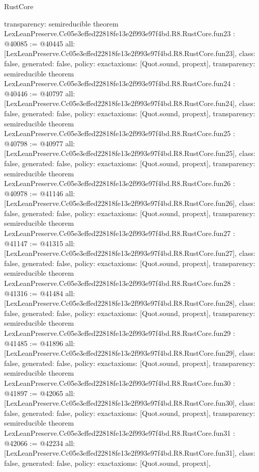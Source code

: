 \begin{lexlean}{RustCore}
\begin{coremodule}
{  transparency: semireducible
}
theorem LexLeanPreserve.Cc05e3effed22818fe13e2f993e97f4bd.R8.RustCore.fun23 : @40085 := @40445 {
  all: [LexLeanPreserve.Cc05e3effed22818fe13e2f993e97f4bd.R8.RustCore.fun23],
  class: false,
  generated: false,
  policy: exact{axioms: [Quot.sound, propext]},
  transparency: semireducible
}
theorem LexLeanPreserve.Cc05e3effed22818fe13e2f993e97f4bd.R8.RustCore.fun24 : @40446 := @40797 {
  all: [LexLeanPreserve.Cc05e3effed22818fe13e2f993e97f4bd.R8.RustCore.fun24],
  class: false,
  generated: false,
  policy: exact{axioms: [Quot.sound, propext]},
  transparency: semireducible
}
theorem LexLeanPreserve.Cc05e3effed22818fe13e2f993e97f4bd.R8.RustCore.fun25 : @40798 := @40977 {
  all: [LexLeanPreserve.Cc05e3effed22818fe13e2f993e97f4bd.R8.RustCore.fun25],
  class: false,
  generated: false,
  policy: exact{axioms: [Quot.sound, propext]},
  transparency: semireducible
}
theorem LexLeanPreserve.Cc05e3effed22818fe13e2f993e97f4bd.R8.RustCore.fun26 : @40978 := @41146 {
  all: [LexLeanPreserve.Cc05e3effed22818fe13e2f993e97f4bd.R8.RustCore.fun26],
  class: false,
  generated: false,
  policy: exact{axioms: [Quot.sound, propext]},
  transparency: semireducible
}
theorem LexLeanPreserve.Cc05e3effed22818fe13e2f993e97f4bd.R8.RustCore.fun27 : @41147 := @41315 {
  all: [LexLeanPreserve.Cc05e3effed22818fe13e2f993e97f4bd.R8.RustCore.fun27],
  class: false,
  generated: false,
  policy: exact{axioms: [Quot.sound, propext]},
  transparency: semireducible
}
theorem LexLeanPreserve.Cc05e3effed22818fe13e2f993e97f4bd.R8.RustCore.fun28 : @41316 := @41484 {
  all: [LexLeanPreserve.Cc05e3effed22818fe13e2f993e97f4bd.R8.RustCore.fun28],
  class: false,
  generated: false,
  policy: exact{axioms: [Quot.sound, propext]},
  transparency: semireducible
}
theorem LexLeanPreserve.Cc05e3effed22818fe13e2f993e97f4bd.R8.RustCore.fun29 : @41485 := @41896 {
  all: [LexLeanPreserve.Cc05e3effed22818fe13e2f993e97f4bd.R8.RustCore.fun29],
  class: false,
  generated: false,
  policy: exact{axioms: [Quot.sound, propext]},
  transparency: semireducible
}
theorem LexLeanPreserve.Cc05e3effed22818fe13e2f993e97f4bd.R8.RustCore.fun30 : @41897 := @42065 {
  all: [LexLeanPreserve.Cc05e3effed22818fe13e2f993e97f4bd.R8.RustCore.fun30],
  class: false,
  generated: false,
  policy: exact{axioms: [Quot.sound, propext]},
  transparency: semireducible
}
theorem LexLeanPreserve.Cc05e3effed22818fe13e2f993e97f4bd.R8.RustCore.fun31 : @42066 := @42234 {
  all: [LexLeanPreserve.Cc05e3effed22818fe13e2f993e97f4bd.R8.RustCore.fun31],
  class: false,
  generated: false,
  policy: exact{axioms: [Quot.sound, propext]},
}
\end{coremodule}
\end{lexlean}
